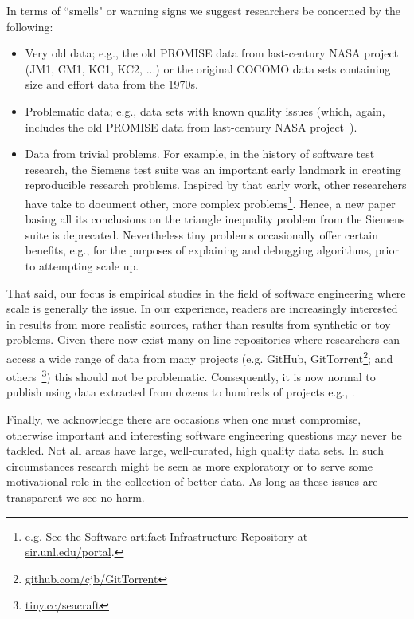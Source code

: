 \documentclass[preprint,10pt]{elsarticle}
\begin{document}
In terms of ``smells" or warning signs we suggest researchers be concerned by the following:
\begin{itemize}
\item Very old data; e.g., the old PROMISE data from last-century NASA project (JM1, CM1, KC1, KC2, ...) or the original COCOMO data sets containing size and effort data from the 1970s.
\item Problematic data; e.g., data sets with known quality issues (which, again, includes the old PROMISE data from last-century NASA project~\cite{shepperd13}).
\item Data from trivial problems.  For example, in the history of software test research, the Siemens test suite
was an important early landmark in creating reproducible research problems. Inspired by that early work, other researchers have take to document other, more complex problems\footnote{e.g. See the Software-artifact Infrastructure Repository at
\href{http://sir.unl.edu/portal}{sir.unl.edu/portal}.}. Hence, a new paper basing all its conclusions on the triangle inequality problem from the Siemens suite is deprecated.   Nevertheless tiny problems occasionally offer certain benefits, e.g., for the purposes of explaining and debugging algorithms, prior to attempting scale up. 
\end{itemize}

That said, our focus is empirical studies in the field of software engineering where scale is generally the issue. In our experience, readers are increasingly interested in results from more realistic sources, rather than results from synthetic or toy problems. Given there now exist many on-line repositories where researchers can access a wide range of data from many projects (e.g. GitHub, GitTorrent\footnote{\href{https://github.com/cjb/GitTorrent}{github.com/cjb/GitTorrent}}; and others~\footnote{\href{http://tiny.cc/seacraft}{tiny.cc/seacraft}}) this should not be problematic. Consequently, it is now normal to publish using data extracted from dozens to hundreds of projects e.g., \cite{rahulSEIP, amritSeip18b}.

Finally, we acknowledge there are occasions when one must compromise, otherwise important and interesting software engineering questions may never be tackled.  Not all areas have large, well-curated, high quality data sets.  In such circumstances research might be seen as more exploratory or to serve some motivational role in the collection of better data.  As long as these issues are transparent we see no harm.
\end{document}
